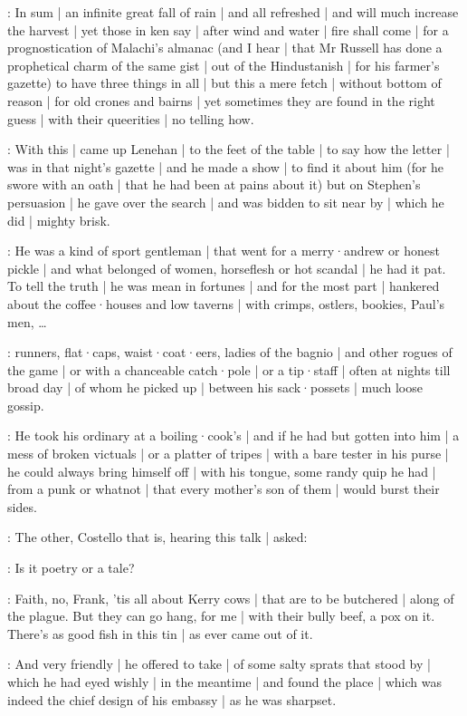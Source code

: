 :
In sum |
an infinite great fall of rain |
and all refreshed |
and will much increase the harvest |
yet those in ken say |
after wind and water |
fire shall come |
for a prognostication of Malachi's almanac
(and I hear |
that Mr Russell has done a prophetical charm of the same gist |
out of the Hindustanish |
for his farmer's gazette)
to have three things in all |
but this a mere fetch |
without bottom of reason |
for old crones and bairns |
yet sometimes they are found in the right guess |
with their queerities |
no telling how.



:
With this |
came up Lenehan |
to the feet of the table |
to say how the letter |
was in that night's gazette |
and he made a show |
to find it about him
(for he swore with an oath |
that he had been at pains about it)
but on Stephen's persuasion |
he gave over the search |
and was bidden to sit near by |
which he did |
mighty brisk.

:
He was a kind of sport gentleman |
that went for a merry·andrew or honest pickle |
and what belonged of women,
horseflesh or hot scandal |
he had it pat.
To tell the truth |
he was mean in fortunes |
and for the most part |
hankered about the coffee·houses and low taverns |
with crimps,
ostlers,
bookies,
Paul's men,
\dots

:
runners,
flat·caps,
waist·coat·eers,
ladies of the bagnio |
and other rogues of the game |
or with a chanceable catch·pole |
or a tip·staff |
often at nights till broad day |
of whom he picked up |
between his sack·possets |
much loose gossip.

:
He took his ordinary at a boiling·cook's |
and if he had but gotten into him |
a mess of broken victuals |
or a platter of tripes |
with a bare tester in his purse |
he could always bring himself off |
with his tongue,
some randy quip he had |
from a punk or whatnot |
that every mother's son of them |
would burst their sides.

:
The other,
Costello that is,
hearing this talk |
asked:

\punch:
Is it poetry or a tale?

\lenehan:
Faith,
no,
Frank,
'tis all about Kerry cows |
that are to be butchered |
along of the plague.
But they can go hang,
for me |
with their bully beef,
a pox on it.
There's as good fish in this tin |
as ever came out of it.

:
And very friendly |
he offered to take |
of some salty sprats that stood by |
which he had eyed wishly |
in the meantime |
and found the place |
which was indeed the chief design of his embassy |
as he was sharpset.

